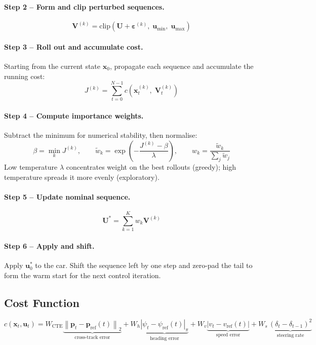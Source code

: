 \documentclass[11pt]{article}
\begin{document}
\paragraph{Step 2 -- Form and clip perturbed sequences.}
\[
\bm{V}^{(k)} = \mathrm{clip}\!\left(\bm{U} + \bm{\varepsilon}^{(k)},\; \bm{u}_{\min},\; \bm{u}_{\max}\right)
\]

\paragraph{Step 3 -- Roll out and accumulate cost.}
Starting from the current state $\bm{x}_0$, propagate each sequence and
accumulate the running cost:
\[
J^{(k)} = \sum_{t=0}^{N-1} c\!\left(\bm{x}_t^{(k)},\; \bm{V}_t^{(k)}\right)
\]

\paragraph{Step 4 -- Compute importance weights.}
Subtract the minimum for numerical stability, then normalise:
\[
\beta = \min_k J^{(k)}, \qquad
\tilde{w}_k = \exp\!\left(-\frac{J^{(k)} - \beta}{\lambda}\right), \qquad
w_k = \frac{\tilde{w}_k}{\sum_j \tilde{w}_j}
\]
Low temperature $\lambda$ concentrates weight on the best rollouts (greedy);
high temperature spreads it more evenly (exploratory).

\paragraph{Step 5 -- Update nominal sequence.}
\[
\bm{U}^* = \sum_{k=1}^{K} w_k \bm{V}^{(k)}
\]

\paragraph{Step 6 -- Apply and shift.}
Apply $\bm{u}_0^*$ to the car.  Shift the sequence left by one step and zero-pad
the tail to form the warm start for the next control iteration.

\subsection{Cost Function}

\[
c(\bm{x}_t, \bm{u}_t) =
  W_{\text{CTE}} \underbrace{\left\|\bm{p}_t - \bm{p}_{\text{ref}}(t)\right\|_2}_{\text{cross-track error}}
+ W_h \underbrace{\left|\psi_t - \psi_{\text{ref}}(t)\right|_{\pi}}_{\text{heading error}}
+ W_v \underbrace{\left|v_t - v_{\text{ref}}(t)\right|}_{\text{speed error}}
+ W_s\, \underbrace{(\delta_t - \delta_{t-1})^2}_{\text{steering rate}}
\]
\end{document}
